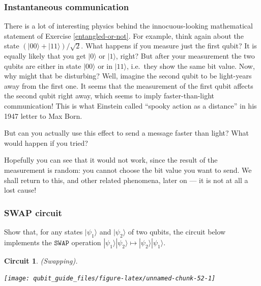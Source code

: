 \documentclass[fleqn,a4paper]{article}
\newtheorem*{circuit}{Circuit}
\theoremstyle{definition}
\theoremstyle{definition}
\theoremstyle{definition}
\theoremstyle{definition}
\theoremstyle{remark}
\begin{document}
\hypertarget{instantaneous-communication}{%
\subsubsection{Instantaneous communication}\label{instantaneous-communication}}

There is a lot of interesting physics behind the innocuous-looking mathematical statement of Exercise \ref{entangled-or-not}.
For example, think again about the state \((|00\rangle+|11\rangle)/\sqrt{2}\).
What happens if you measure just the first qubit?
It is equally likely that you get \(|0\rangle\) or \(|1\rangle\), right?
But after your measurement the two qubits are either in state \(|00\rangle\) or in \(|11\rangle\), i.e.~they show the same bit value.
Now, why might that be disturbing?
Well, imagine the second qubit to be light-years away from the first one.
It seems that the measurement of the first qubit affects the second qubit right away, which seems to imply faster-than-light communication!
This is what Einstein called ``spooky action as a distance'' in his 1947 letter to Max Born.

But can you actually use this effect to send a message faster than light?
What would happen if you tried?

Hopefully you can see that it would not work, since the result of the measurement is random: you cannot choose the bit value you want to send.
We shall return to this, and other related phenomena, later on --- it is not at all a lost cause!

\hypertarget{swap-circuit}{%
\subsubsection{SWAP circuit}\label{swap-circuit}}

Show that, for any states \(|\psi_1\rangle\) and \(|\psi_2\rangle\) of two qubits, the circuit below implements the \(\texttt{SWAP}\) operation \(|\psi_1\rangle|\psi_2\rangle \mapsto |\psi_2\rangle|\psi_1\rangle\).

\begin{circuit}

\emph{(Swapping).}

\begin{center}\texttt{[image: qubit\_guide\_files/figure-latex/unnamed-chunk-52-1]} \end{center}

\end{circuit}
\end{document}
